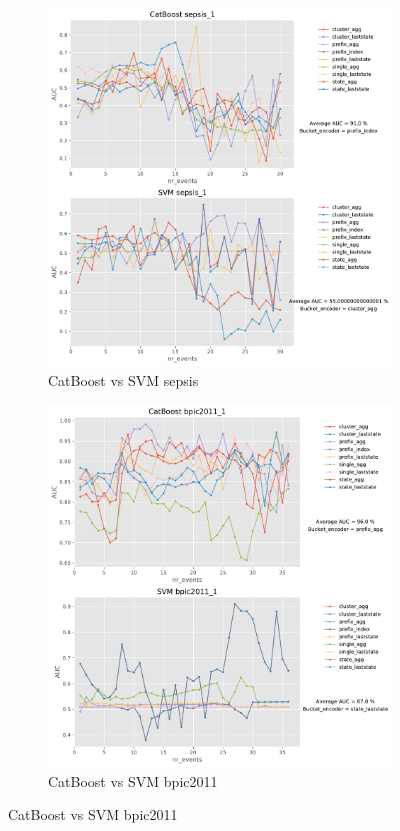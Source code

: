 \documentclass[twoside,11pt]{Latex/Classes/PhDthesisPSnPDF}
\begin{document}
\begin{figure}[t!] %
		
	\begin{subfigure}{0.48\textwidth}
		\includegraphics[width=\linewidth]{images/catboost/graphssvm/sepsis_1_CatBoost_svm.pdf}
		\caption{CatBoost vs SVM sepsis} \label{fig:sepsiscs}
	\end{subfigure}\hspace*{\fill}
	\begin{subfigure}{0.48\textwidth}
		\includegraphics[width=\linewidth]{images/catboost/graphssvm/bpic2011_1_CatBoost_svm.pdf}
		\caption{CatBoost vs SVM bpic2011} \label{fig:b11rs}
	\end{subfigure}
	

\end{figure}
\end{document}
